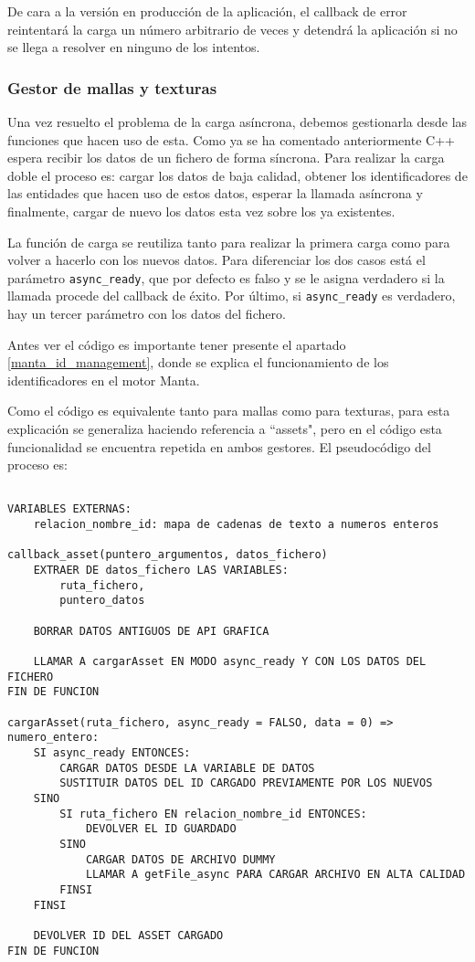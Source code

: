 De cara a la versión en producción de la aplicación, el callback de error reintentará la carga un número arbitrario de veces y detendrá la aplicación si no se llega a resolver en ninguno de los intentos.

\subsubsection{Gestor de mallas y texturas}
Una vez resuelto el problema de la carga asíncrona, debemos gestionarla desde las funciones que hacen uso de esta. Como ya se ha comentado anteriormente C++ espera recibir los datos de un fichero de forma síncrona. Para realizar la carga doble el proceso es: cargar los datos de baja calidad, obtener los identificadores de las entidades que hacen uso de estos datos, esperar la llamada asíncrona y finalmente, cargar de nuevo los datos esta vez sobre los ya existentes.

La función de carga se reutiliza tanto para realizar la primera carga como para volver a hacerlo con los nuevos datos. Para diferenciar los dos casos está el parámetro \texttt{async\_ready}, que por defecto es falso y se le asigna verdadero si la llamada procede del callback de éxito. Por último, si \texttt{async\_ready} es verdadero, hay un tercer parámetro con los datos del fichero.

Antes ver el código es importante tener presente el apartado \ref{manta_id_management}, donde se explica el funcionamiento de los identificadores en el motor Manta.

Como el código es equivalente tanto para mallas como para texturas, para esta explicación se generaliza haciendo referencia a ``assets", pero en el código esta funcionalidad se encuentra repetida en ambos gestores. El pseudocódigo del proceso es:

\begin{lstlisting}

VARIABLES EXTERNAS:
    relacion_nombre_id: mapa de cadenas de texto a numeros enteros
    
callback_asset(puntero_argumentos, datos_fichero)
    EXTRAER DE datos_fichero LAS VARIABLES:
        ruta_fichero,
        puntero_datos
        
    BORRAR DATOS ANTIGUOS DE API GRAFICA
    
    LLAMAR A cargarAsset EN MODO async_ready Y CON LOS DATOS DEL FICHERO
FIN DE FUNCION

cargarAsset(ruta_fichero, async_ready = FALSO, data = 0) => numero_entero:
    SI async_ready ENTONCES:
        CARGAR DATOS DESDE LA VARIABLE DE DATOS
        SUSTITUIR DATOS DEL ID CARGADO PREVIAMENTE POR LOS NUEVOS
    SINO
        SI ruta_fichero EN relacion_nombre_id ENTONCES:
            DEVOLVER EL ID GUARDADO
        SINO
            CARGAR DATOS DE ARCHIVO DUMMY
            LLAMAR A getFile_async PARA CARGAR ARCHIVO EN ALTA CALIDAD
        FINSI
    FINSI
    
    DEVOLVER ID DEL ASSET CARGADO
FIN DE FUNCION
\end{lstlisting}

